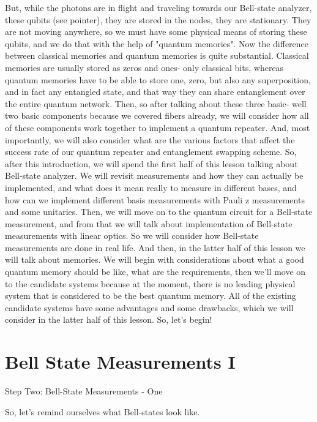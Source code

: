 But, while the photons are in flight and traveling towards our Bell-state analyzer, these qubits (see pointer), they are stored in the nodes, they are stationary. They are not moving anywhere, so we must have some physical means of storing these qubits, and we do that with the help of "quantum memories". Now the difference between classical memories and quantum memories is quite substantial. Classical memories are usually stored as zeros and ones- only classical bits, whereas quantum memories have to be able to store one, zero, but also any superposition, and in fact any entangled state, and that way they can share entanglement over the entire quantum network. Then, so after talking about these three basic- well two basic components because we covered fibers already, we will consider how all of these components work together to implement a quantum repeater. And, most importantly, we will also consider what are the various factors that affect the success rate of our quantum repeater and entanglement swapping scheme. So, after this introduction, we will spend the first half of this lesson talking about Bell-state analyzer. We will revisit measurements and how they can actually be implemented, and what does it mean really to measure in different bases, and how can we implement different basis measurements with Pauli z measurements and some unitaries. Then, we will move on to the quantum circuit for a Bell-state measurement, and from that we will talk about implementation of Bell-state measurements with linear optics. So we will consider how Bell-state measurements are done in real life. And then, in the latter half of this lesson we will talk about memories. We will begin with considerations about what a good quantum memory should be like, what are the requirements, then we'll move on to the candidate systems because at the moment, there is no leading physical system that is considered to be the best quantum memory. All of the existing candidate systems have some advantages and some drawbacks, which we will consider in the latter half of this lesson. So, let's begin!



\section{Bell State Measurements I}

Step Two: Bell-State Measurements - One

So, let's remind ourselves what Bell-states look like.

